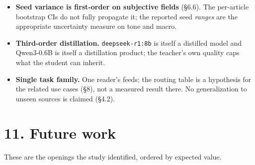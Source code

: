 \documentclass[11pt]{article}
\begin{document}
\begin{itemize}
\item
  \textbf{Seed variance is first-order on subjective fields} (§6.6). The
  per-article bootstrap CIs do not fully propagate it; the reported seed
  \emph{ranges} are the appropriate uncertainty measure on tone and
  macro.
\item
  \textbf{Third-order distillation.} \texttt{deepseek-r1:8b} is itself a
  distilled model and Qwen3-0.6B is itself a distillation product; the
  teacher's own quality caps what the student can inherit.
\item
  \textbf{Single task family.} One reader's feeds; the routing table is
  a hypothesis for the related use cases (§8), not a measured result
  there. No generalization to unseen sources is claimed (§4.2).
\end{itemize}

\section{11. Future work}\label{future-work}

These are the openings the study identified, ordered by expected value.
\end{document}
